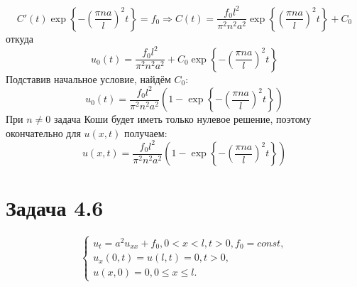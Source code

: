 \documentclass[11pt]{article}
\begin{document}
$$C'(t)\exp\left\{-\left(\frac{\pi na}l\right)^2t\right\} = f_0 \Rightarrow C(t) = \frac{f_0l^2}{\pi^2 n^2a^2}\exp\left\{\left(\frac{\pi na}l\right)^2t\right\} + C_0$$
откуда
\begin{equation*}
u_0(t) = \frac{f_0l^2}{\pi^2n^2a^2} + C_0\exp\left\{-\left(\frac{\pi na}l\right)^2t\right\}
\end{equation*}
Подставив начальное условие, найдём $C_0$:
\begin{equation*}
u_0(t) = \frac{f_0l^2}{\pi^2n^2a^2}\left(1 - \exp\left\{-\left(\frac{\pi na}l\right)^2t\right\}\right)
\end{equation*}
При $n \neq 0$ задача Коши будет иметь только нулевое решение, поэтому окончательно для $u(x, t)$ получаем:
\begin{equation}
u(x, t) = \frac{f_0l^2}{\pi^2n^2a^2}\left(1 - \exp\left\{-\left(\frac{\pi na}l\right)^2t\right\}\right)
\end{equation}
\section{Задача 4.6}
\label{sec:org34a92f3}
\begin{equation}
\begin{cases}
u_t = a^2u_{xx} + f_0, 0 < x < l, t > 0, f_0 = const, \\
u_x(0, t) = u(l, t) = 0, t > 0, \\
u(x, 0) = 0, 0 \leq x \leq l.
\end{cases}
\end{equation}
\end{document}
